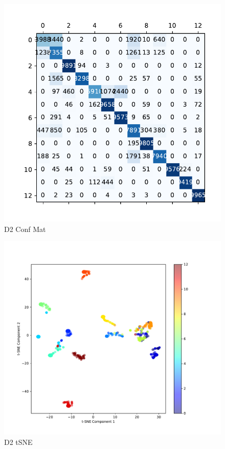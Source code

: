 \documentclass{article}
\begin{document}
	\begin{figure}[htbp]
		\centering
		\includegraphics[width=\linewidth]{Figs/diagnosis2_confusion_matrix.pdf}
		\caption{D2 Conf Mat}
		\vspace{0.3cm}
		\label{fig:D2_conf_mat}
	\end{figure}
	
	\begin{figure}[htbp]
		\centering
		\includegraphics[width=\linewidth]{Figs/diagnosis2_tSNE.pdf}
		\caption{D2 tSNE}
		\vspace{0.3cm}
		\label{fig:D2_tSNE}
	\end{figure}
	
\end{document}
